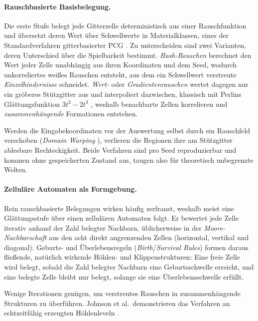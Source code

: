 \documentclass[11pt,a4paper]{article}
\begin{document}
\paragraph{Rauschbasierte Basisbelegung.}
Die erste Stufe belegt jede Gitterzelle deterministisch aus einer Rauschfunktion
und übersetzt deren Wert über Schwellwerte in Materialklassen, eines der
Standardverfahren gitterbasierter PCG \cite{shaker2016pcg}. Zu unterscheiden
sind zwei Varianten, deren Unterschied über die Spielbarkeit bestimmt.
\emph{Hash-Rauschen} berechnet den Wert jeder Zelle unabhängig aus ihren
Koordinaten und dem Seed, wodurch unkorreliertes weißes Rauschen entsteht, aus
dem ein Schwellwert verstreute \emph{Einzelhindernisse} schneidet. \emph{Wert-}
oder \emph{Gradientenrauschen} wertet dagegen nur ein gröberes Stützgitter aus
und interpoliert dazwischen, klassisch mit Perlins Glättungsfunktion
$3t^2 - 2t^3$ \cite{perlin1985image}, weshalb benachbarte Zellen korrelieren und
\emph{zusammenhängende} Formationen entstehen.

Werden die Eingabekoordinaten vor der Auswertung selbst durch ein Rauschfeld
verschoben (\emph{Domain Warping} \cite{quilez2008warp}), verlieren die
Regionen ihre am Stützgitter ablesbare Rechteckigkeit. Beide Verfahren sind
pro Seed reproduzierbar und
kommen ohne gespeicherten Zustand aus, taugen also für theoretisch unbegrenzte
Welten.

\paragraph{Zelluläre Automaten als Formgebung.}
Rein rauschbasierte Belegungen wirken häufig zerfranst, weshalb meist eine
Glättungsstufe über einen zellulären Automaten folgt. Er bewertet jede Zelle
iterativ anhand der Zahl belegter Nachbarn, üblicherweise in der
\emph{Moore-Nachbarschaft} aus den acht direkt angrenzenden Zellen (horizontal,
vertikal und diagonal). Geburts- und Überlebensregeln
(\emph{Birth}/\emph{Survival Rules}) formen daraus fließende, natürlich wirkende
Höhlen- und Klippenstrukturen: Eine freie Zelle wird belegt, sobald die Zahl
belegter Nachbarn eine Geburtsschwelle erreicht, und eine belegte Zelle bleibt
nur belegt, solange sie eine Überlebensschwelle erfüllt.

Wenige Iterationen genügen, um verstreutes Rauschen in zusammenhängende
Strukturen zu überführen. Johnson et al.\ demonstrieren das Verfahren an
echtzeitfähig erzeugten Höhlenleveln \cite{johnson2010cellular}.
\end{document}
